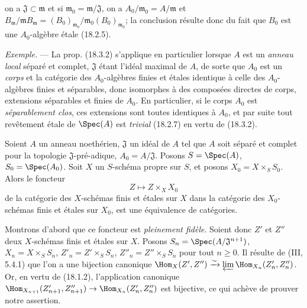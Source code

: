 
on a $\mathfrak J\subset\mathfrak m$ et si $\mathfrak m_0=\mathfrak m/\mathfrak J$, on a $A_0/\mathfrak m_0=A/\mathfrak m$ et $B_{\mathfrak m}/\mathfrak mB_{\mathfrak m}=(B_0)_{\mathfrak m_0}/\mathfrak m_0(B_0)_{\mathfrak m_0}$; la conclusion résulte donc du fait que $B_0$ est une $A_0$-algèbre étale (18.2.5).

\begin{env}[18.3.3]
\label{IV.18.3.3}
\emph{Exemple.} --- La prop. (18.3.2) s'applique en particulier lorsque $A$ est un \emph{anneau local} séparé et complet, $\mathfrak J$ étant l'idéal maximal de $A$, de sorte que $A_0$ est un \emph{corps} et la catégorie des $A_0$-algèbres finies et étales identique à celle des $A_0$-algèbres finies et séparables, donc isomorphes à des composées directes de corps, extensions séparables et finies de $A_0$. En particulier, si le corps $A_0$ est \emph{séparablement clos}, ces extensions sont toutes identiques à $A_0$, et par suite tout revêtement étale de $\Spec(A)$ est \emph{trivial} (18.2.7) en vertu de (18.3.2).
\end{env}

\begin{theorem}[18.3.4]
\label{IV.18.3.4}
Soient $A$ un anneau noethérien, $\mathfrak J$ un idéal de $A$ tel que $A$ soit séparé et complet pour la topologie $\mathfrak J$-pré-adique, $A_0=A/\mathfrak J$. Posons $S=\Spec(A)$, $S_0=\Spec(A_0)$. Soit $X$ un $S$-schéma propre sur $S$, et posons $X_0=X\times_S S_0$. Alors le foncteur
\[
  Z\longmapsto Z\times_X X_0
\]
de la catégorie des $X$-schémas finis et étales sur $X$ dans la catégorie des $X_0$-schémas finis et étales sur $X_0$, est une équivalence de catégories.
\end{theorem}

Montrons d'abord que ce foncteur est \emph{pleinement fidèle}. Soient donc $Z'$ et $Z''$ deux $X$-schémas finis et étales sur $X$. Posons $S_n=\Spec(A/\mathfrak J^{n+1})$, $X_n=X\times_S S_n$, $Z'_n=Z'\times_S S_n$, $Z''_n=Z''\times_S S_n$ pour tout $n\geq 0$. Il résulte de (III, 5.4.1) que l'on a une bijection canonique $\Hom_X(Z',Z'')\xrightarrow{\sim}\varprojlim\Hom_{X_n}(Z'_n,Z''_n)$. Or, en vertu de (18.1.2), l'application canonique $\Hom_{X_{n+1}}(Z'_{n+1},Z''_{n+1})\to\Hom_{X_n}(Z'_n,Z''_n)$ est bijective, ce qui achève de prouver notre assertion.

